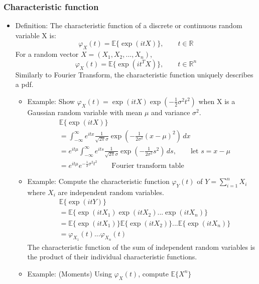 \documentclass[12pt]{article}
\begin{document}
\subsubsection{Characteristic function}
\begin{itemize}
\item Definition: The characteristic function of a discrete or continuous random variable X is:
\[
\varphi_X(t) = \mathbb{E} \{ \exp (itX)\}, \qquad t \in \mathbb{R}
\]
For a random vector $X=(X_1,X_2,...,X_n)$,
\[
\varphi_X(t) = \mathbb{E} \{ \exp (it^T X)\}, \qquad t \in \mathbb{R}^n
\]
Similarly to Fourier Transform, the characteristic function uniquely describes a pdf.
\begin{itemize}
\item Example: Show $\varphi_X(t) = \exp (itX) \exp (-\frac{1}{2}\sigma^2t^2)$ when X is a Gaussian random variable with mean $\mu$ and variance $\sigma^2$.
\begin{align*}
&\mathbb{E} \{ \exp (itX)\} \\
&= \int_{-\infty}^\infty e^{itx} \frac{1}{\sqrt{2\pi}\sigma} \exp\left(-\frac{1}{2\sigma^2}(x-\mu)^2\right) \, dx \\
&= e^{it\mu} \int_{-\infty}^\infty e^{its} \frac{1}{\sqrt{2\pi}\sigma} \exp\left(-\frac{1}{2\sigma^2}s^2\right) \, ds, \qquad \textrm{let } s = x-\mu \\
&= e^{it\mu}e^{-\frac{1}{2}\sigma^2t^2}   \qquad \textrm{Fourier transform table}
\end{align*}
\item Example: Compute the characteristic function $\varphi_Y(t)$ of $Y= \sum_{i=1}^n X_i$ where $X_i$ are \textcolor{blue1}{independent} random variables.
\begin{align*}
&\mathbb{E} \{ \exp (itY)\} \\
&=  \mathbb{E} \{ \exp (itX_1) \exp (itX_2)... \exp (itX_n)\}\\
&= \mathbb{E} \{ \exp (itX_1)\} \mathbb{E} \{ \exp (itX_2)\}...\mathbb{E} \{ \exp (itX_n)\}\\
&= \varphi_{X_1}(t)...\varphi_{X_n}(t)
\end{align*}
The characteristic function of the \textcolor{blue1}{sum of independent random variables} is the \textcolor{blue1}{product} of their individual characteristic functions.

\item Example: (Moments) Using $\varphi_{X}(t)$, compute $\mathbb{E}\{X^n\}$


\end{itemize}
\end{itemize}
\end{document}
